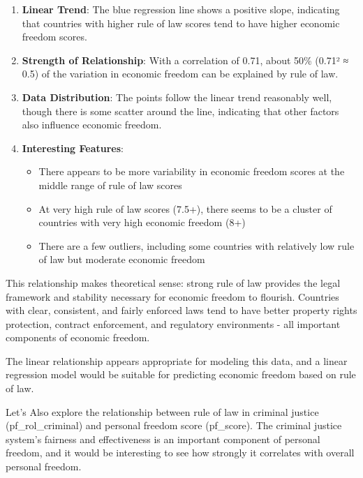 \documentclass[
]{article}
\providecommand{\tightlist}{%
  \setlength{\itemsep}{0pt}\setlength{\parskip}{0pt}}
\begin{document}
\begin{enumerate}
\def\labelenumi{\arabic{enumi}.}
\item
  \textbf{Linear Trend}: The blue regression line shows a positive
  slope, indicating that countries with higher rule of law scores tend
  to have higher economic freedom scores.
\item
  \textbf{Strength of Relationship}: With a correlation of 0.71, about
  50\% (0.71² ≈ 0.5) of the variation in economic freedom can be
  explained by rule of law.
\item
  \textbf{Data Distribution}: The points follow the linear trend
  reasonably well, though there is some scatter around the line,
  indicating that other factors also influence economic freedom.
\item
  \textbf{Interesting Features}:

  \begin{itemize}
  \tightlist
  \item
    There appears to be more variability in economic freedom scores at
    the middle range of rule of law scores
  \item
    At very high rule of law scores (7.5+), there seems to be a cluster
    of countries with very high economic freedom (8+)
  \item
    There are a few outliers, including some countries with relatively
    low rule of law but moderate economic freedom
  \end{itemize}
\end{enumerate}

This relationship makes theoretical sense: strong rule of law provides
the legal framework and stability necessary for economic freedom to
flourish. Countries with clear, consistent, and fairly enforced laws
tend to have better property rights protection, contract enforcement,
and regulatory environments - all important components of economic
freedom.

The linear relationship appears appropriate for modeling this data, and
a linear regression model would be suitable for predicting economic
freedom based on rule of law.

Let's Also explore the relationship between rule of law in criminal
justice (pf\_rol\_criminal) and personal freedom score (pf\_score). The
criminal justice system's fairness and effectiveness is an important
component of personal freedom, and it would be interesting to see how
strongly it correlates with overall personal freedom.
\end{document}

